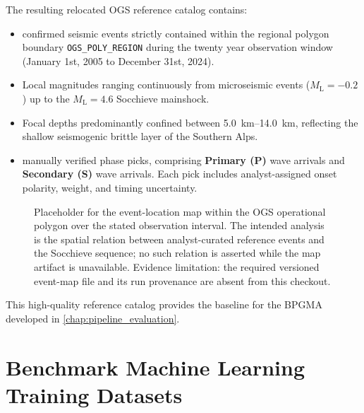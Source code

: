 The resulting relocated \ac{OGS} reference catalog contains:
\begin{itemize}
  \item {} confirmed seismic events strictly
    contained within the regional polygon boundary \texttt{OGS\_POLY\_REGION}
    during the twenty year observation window (January 1st, 2005 to December
    31st, 2024).
  \item Local magnitudes ranging continuously from microseismic events
    ($M_{\mathrm{L}} = \num{-0.2}$) up to the $M_{\mathrm{L}} = \num{4.6}$
    Socchieve mainshock.
  \item Focal depths predominantly confined between
    \qtyrange{5.0}{14.0}{\kilo\meter}, reflecting the shallow seismogenic
    brittle layer of the Southern Alps.
  \item {} manually verified phase picks, comprising
    \textbf{ Primary (P)} wave arrivals and
    \textbf{ Secondary (S)} wave arrivals. Each pick
    includes analyst-assigned onset polarity, weight, and timing uncertainty.
\end{itemize}

\begin{figure}[htbp]
  \centering
  \caption{Placeholder for the event-location map within the \ac{OGS}
    operational polygon over the stated observation interval. The intended
    analysis is the spatial relation between analyst-curated reference events
    and the Socchieve sequence; no such relation is asserted while the map
    artifact is unavailable. Evidence limitation: the required versioned
    event-map file and its run provenance are absent from this checkout.
  }
  \label{fig:ogs_seismicity}
\end{figure}

This high-quality reference catalog provides the baseline for the \ac{BPGMA}
developed in \cref{chap:pipeline_evaluation}.

\section{Benchmark Machine Learning Training Datasets}
\label{sec:benchmark_datasets}

